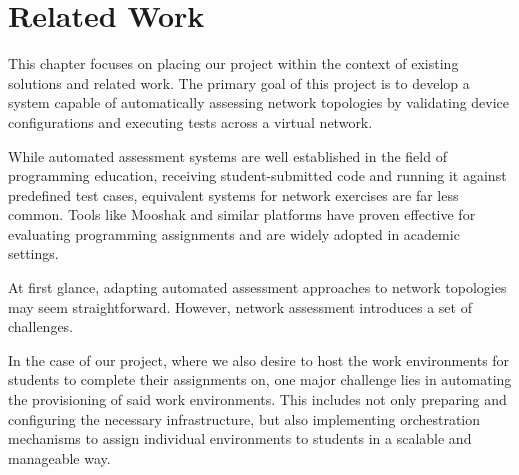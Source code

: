 
\chapter{Related Work}


\label{Chapter3RelatedWork}


This chapter focuses on placing our project within the context of existing solutions and related work. The primary 
goal of this project is to develop a system capable of automatically assessing network topologies by validating device 
configurations and executing tests across a virtual network.

While automated assessment systems are well established in the field of programming education, receiving student-submitted 
code and running it against predefined test cases, equivalent systems for network exercises are far less common. Tools like 
Mooshak\cite{Leal2003567} and similar platforms have proven effective for evaluating programming assignments and are widely adopted in academic 
settings.

At first glance, adapting automated assessment approaches to network topologies may seem straightforward. 
However, network assessment introduces a set of challenges.

In the case of our project, where we also desire to host the work environments for students to complete their assignments on, 
one major challenge lies in automating the provisioning of said work environments. This includes not only preparing and 
configuring the necessary infrastructure, but also implementing orchestration mechanisms to assign individual environments 
to students in a scalable and manageable way.

